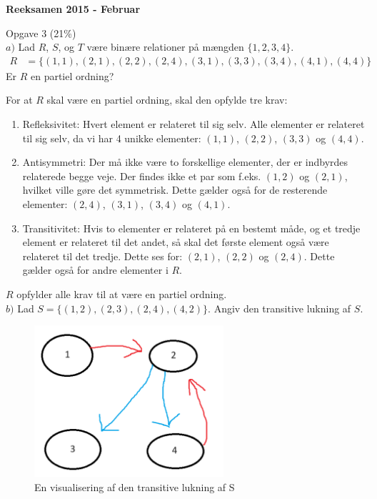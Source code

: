 \documentclass{article}
\begin{document}
\begin{center}
    \huge\bfseries Reeksamen 2015 - Februar \\
\end{center}
Opgave 3 (21\%) \\

\noindent
$a)$ Lad $R$, $S$, og $T$ være binære relationer på mængden $\{1,2,3,4\}$.
\begin{align*}
    R &= \{(1,1),(2,1),(2,2),(2,4),(3,1),(3,3),(3,4),(4,1),(4,4)\}
\end{align*}
Er $R$ en partiel ordning?

For at $R$ skal være en partiel ordning, skal den opfylde tre krav:
\begin{enumerate}
    \item Refleksivitet: Hvert element er relateret til sig selv. Alle elementer er relateret til sig selv, da vi har 4 unikke elementer: $(1,1)$, $(2,2)$, $(3,3)$ og $(4,4)$.
    
    \item Antisymmetri: Der må ikke være to forskellige elementer, der er indbyrdes relaterede begge veje. Der findes ikke et par som f.eks. $(1,2)$ og $(2,1)$, hvilket ville gøre det symmetrisk. Dette gælder også for de resterende elementer: $(2,4)$, $(3,1)$, $(3,4)$ og $(4,1)$.
    
    \item Transitivitet: Hvis to elementer er relateret på en bestemt måde, og et tredje element er relateret til det andet, så skal det første element også være relateret til det tredje. Dette ses for: $(2,1)$, $(2,2)$ og $(2,4)$. Dette gælder også for andre elementer i $R$.
\end{enumerate}
$R$ opfylder alle krav til at være en partiel ordning. \\
\newpage
$b)$ Lad $S = \{(1,2),(2,3),(2,4),(4,2)\}$.
Angiv den transitive lukning af $S$. \\
\begin{figure}[h!]
    \centering
    \includegraphics[width=7cm]{Pictures/123123123123.png}
    \caption{En visualisering af den transitive lukning af S}
    \label{fig:S}
\end{figure}
\end{document}
